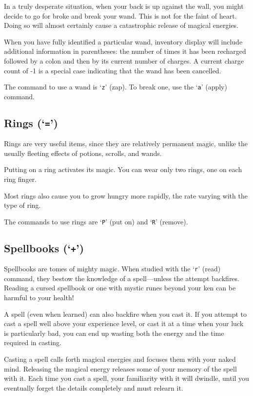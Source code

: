 In a truly desperate situation, when your back is up against the wall, you
might decide to go for broke and break your wand.  This is not for the faint
of heart.  Doing so will almost certainly cause a catastrophic release of
magical energies.

When you have fully identified a particular wand, inventory display will
include additional information in parentheses: the number of times it has
been recharged followed by a colon and then by its current number of charges.
A current charge count of -1 is a special case indicating that the wand
has been cancelled.

The command to use a wand is `{\tt z}' (zap).  To break one, use the `{\tt a}' (apply)
command.
\subsection*{Rings (`{\tt =}')}


Rings are very useful items, since they are relatively permanent
magic, unlike the usually fleeting effects of potions, scrolls, and
wands.

Putting on a ring activates its magic.  You can wear only two
rings, one on each ring finger.

Most rings also cause you to grow hungry more rapidly, the rate
varying with the type of ring.  

The commands to use rings are `{\tt P}' (put on) and `{\tt R}' (remove).
\subsection*{Spellbooks (`{\tt +}')}


Spellbooks are tomes of mighty magic.  When studied with the `{\tt r}' (read)
command, they bestow the knowledge of a spell---unless the attempt
backfires.
Reading a cursed spellbook or one with mystic runes beyond
your ken can be harmful to your health!

A spell (even when learned) can also backfire when you cast it.  If you
attempt to cast a spell well above your experience level, or cast it at
a time when your luck is particularly bad, you can end up wasting both the
energy and the time required in casting.

Casting a spell calls forth magical energies and focuses them with
your naked mind.  Releasing the magical energy releases some of your
memory of the spell with it.  Each time you cast a spell, your
familiarity with it will dwindle, until you eventually forget the
details completely and must relearn it.

